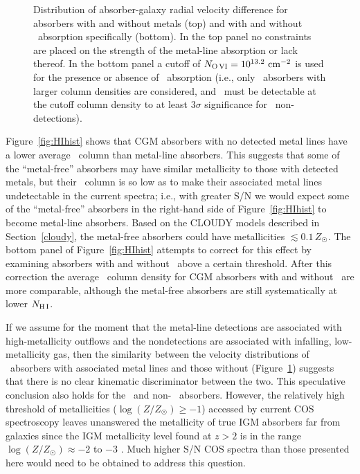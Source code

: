 \documentclass[twocolumn,twocolappendix,tighten,times]{aastex6}
\newcommand{\HI}{\ion{H}{1}}
\newcommand{\OVI}{\ion{O}{6}}
\begin{document}
\begin{figure}[!b]
\caption{Distribution of absorber-galaxy radial velocity difference for absorbers with and without metals (top) and with and without \OVI\ absorption specifically (bottom). In the top panel no constraints are placed on the strength of the metal-line absorption or lack thereof. In the bottom panel a cutoff of $N_{\rm O\,VI} = 10^{13.2}~{\rm cm}^{-2}$ is used for the presence or absence of \OVI\ absorption (i.e., only \OVI\ absorbers with larger column densities are considered, and \OVI\ must be detectable at the cutoff column density to at least $3\sigma$ significance for \OVI\ non-detections).
\label{fig:dvhist}}
\end{figure}


Figure~\ref{fig:HIhist} shows that CGM absorbers with no detected metal lines 
have a lower average \HI\ column than metal-line absorbers. This suggests that 
some of the ``metal-free'' absorbers may have similar metallicity to those with detected metals, but their \HI\ column is so low as to make their associated 
metal lines undetectable in the current spectra; i.e., with greater S/N we 
would expect some of the ``metal-free'' absorbers in the right-hand side of 
Figure~\ref{fig:HIhist} to become metal-line absorbers. Based on the CLOUDY 
models described in Section~\ref{cloudy}, the metal-free absorbers could 
have metallicities $\lesssim0.1\,Z_{\Sun}$. The bottom panel of 
Figure~\ref{fig:HIhist} attempts to correct for this effect by examining 
absorbers with and without \OVI\ above a certain threshold. After this 
correction the average \HI\ column density for CGM absorbers with and 
without \OVI\ are more comparable, although the metal-free absorbers are 
still systematically at lower $N_{\rm H\,I}$. 

If we assume for the moment that the metal-line detections are 
associated with high-metallicity outflows and the nondetections are associated 
with infalling, low-metallicity gas, then the similarity between the velocity 
distributions of \HI\ absorbers with associated metal lines and those without 
(Figure~\ref{fig:dvhist}) suggests that there is no clear kinematic discriminator 
between the two. This speculative conclusion also holds for the \OVI\ and non-
\OVI\ absorbers. However, the relatively high threshold of metallicities 
($\log{(Z/Z_{\Sun})} \geq -1$) accessed by current COS spectroscopy leaves 
unanswered the metallicity of true IGM absorbers far from galaxies since the 
IGM metallicity level found at $z > 2$ is in the range 
$\log{(Z/Z_{\Sun})} \approx -2$ to $-3$ \citep*{schaye03,aguirre04,simcoe04}. 
Much higher S/N COS spectra than those presented here would need to be obtained to 
address this question.
\end{document}
